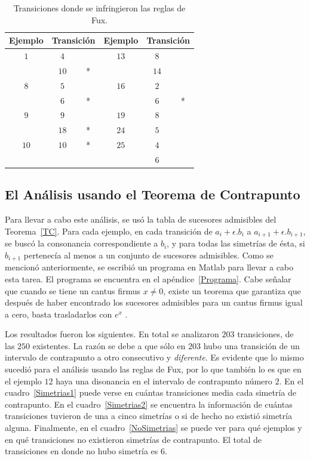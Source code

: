 \documentclass[letterpaper,12pt]{book}
\theoremstyle{definition} \newtheorem{Def}{Definición}[chapter]
\theoremstyle{definition} \newtheorem{Teo}{Teorema}[chapter]
\theoremstyle{definition} \newtheorem{Pro}{Proposición}[chapter]
\theoremstyle{definition} \newtheorem{Lema}{Lema}[chapter]
\begin{document}
\begin{table}[h]
\centering
\begin{tabular}{| c | c | c | c | c | c |}
\hline
Ejemplo & \multicolumn{2}{c|}{Transición} & Ejemplo & \multicolumn{2}{c|}{Transición}\\
\hline
$1$ & $4$   &    & $13$ & $8$ &  \\
        & $10$ & * &           & $14$ & \\
\hline
$8$ & $5$  &      & $16$ & $2$ & \\
        & $6$  &  *  &            & $6$ & *\\
\hline
$9$ & $9$   &  &  $19$ & $8$ & \\ \cline{4-6}
        & $18$ & *& $24$ & $5$ & \\
\hline
$10$ & $10$ & * & $25$ &  $4$ &\\
          &            &   &            & $6$  & \\
\hline
\end{tabular}
\caption{\label{Faltas}Transiciones donde se infringieron las reglas de Fux.}
\end{table}
 
\subsection{El Análisis usando el Teorema de Contrapunto}

Para llevar a cabo este análisis, se usó la tabla de sucesores admisibles del Teorema~\ref{TC}. Para cada ejemplo, en cada transición de $a_i+ \epsilon.b_i$ a $a_{i+1}+\epsilon.b_{i+1}$, se buscó la consonancia correspondiente a $b_i$, y para todas las simetrías de ésta, si $b_{i+1}$ pertenecía al menos a un conjunto de sucesores admisibles. Como se mencionó anteriormente, se escribió un programa en Matlab para llevar a cabo esta tarea. El programa se encuentra en el apéndice~\ref{Programa}. Cabe señalar que cuando se tiene un cantus firmus $x\neq 0$, existe un teorema que garantiza que después de haber encontrado los sucesores admisibles para un cantus firmus igual a cero, basta trasladarlos con $e^x$ \cite{TesisOctavio}.

Los resultados fueron los siguientes. En total se analizaron $203$ transiciones, de las $250$ existentes. La razón se debe a que sólo en $203$ hubo una transición de un intervalo de contrapunto a otro consecutivo y \emph{diferente}. Es evidente que lo mismo sucedió para el análisis usando las reglas de Fux, por lo que también lo es que en el ejemplo $12$ haya una disonancia en el intervalo de contrapunto número $2$.  En el cuadro~\ref{Simetrias1} puede verse en cuántas transiciones media cada simetría de contrapunto. En el cuadro~\ref{Simetrias2} se encuentra la información de cuántas transiciones tuvieron de una a cinco simetrías o si de hecho no existió simetría alguna. Finalmente, en el cuadro~\ref{NoSimetrias} se puede ver para qué ejemplos y en qué transiciones no existieron simetrías de contrapunto. El total de transiciones en donde no hubo simetría es $6$.
\end{document}
